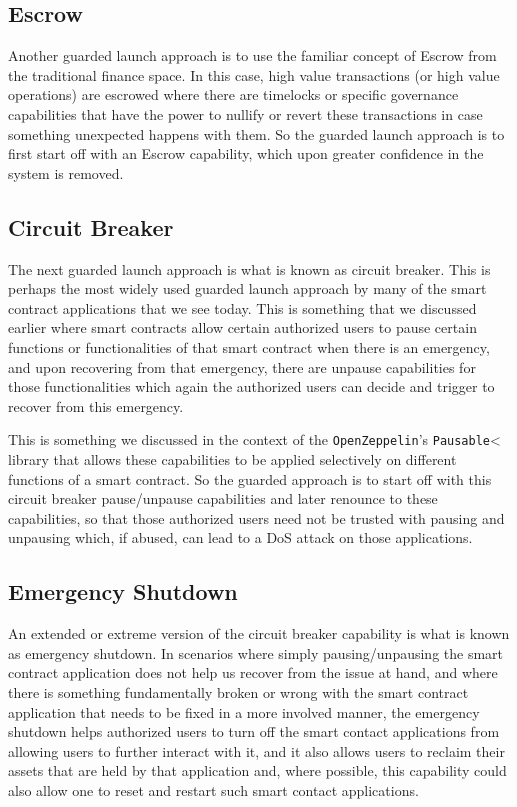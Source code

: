 \subsection{Escrow}\label{escrow}

Another guarded launch approach is to use the familiar concept of Escrow
from the traditional finance space. In this case, high value
transactions (or high value operations) are escrowed where there are
timelocks or specific governance capabilities that have the power to
nullify or revert these transactions in case something unexpected
happens with them. So the guarded launch approach is to first start off
with an Escrow capability, which upon greater confidence in the system
is removed.

\subsection{Circuit Breaker}\label{circuit-breaker}

The next guarded launch approach is what is known as circuit breaker.
This is perhaps the most widely used guarded launch approach by many of
the smart contract applications that we see today. This is something
that we discussed earlier where smart contracts allow certain authorized
users to pause certain functions or functionalities of that smart
contract when there is an emergency, and upon recovering from that
emergency, there are unpause capabilities for those functionalities
which again the authorized users can decide and trigger to recover from
this emergency.

This is something we discussed in the context of the
\texttt{OpenZeppelin}'s \texttt{Pausable}\textless{} library that allows
these capabilities to be applied selectively on different functions of a
smart contract. So the guarded approach is to start off with this
circuit breaker pause/unpause capabilities and later renounce to these
capabilities, so that those authorized users need not be trusted with
pausing and unpausing which, if abused, can lead to a DoS attack on
those applications.

\subsection{Emergency Shutdown}\label{emergency-shutdown}

An extended or extreme version of the circuit breaker capability is what
is known as emergency shutdown. In scenarios where simply
pausing/unpausing the smart contract application does not help us
recover from the issue at hand, and where there is something
fundamentally broken or wrong with the smart contract application that
needs to be fixed in a more involved manner, the emergency shutdown
helps authorized users to turn off the smart contact applications from
allowing users to further interact with it, and it also allows users to
reclaim their assets that are held by that application and, where
possible, this capability could also allow one to reset and restart such
smart contact applications.

